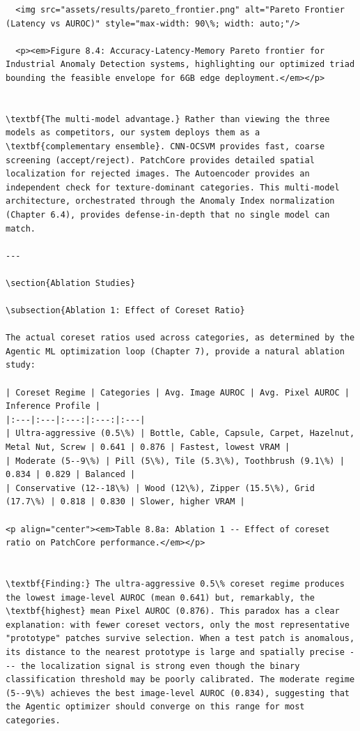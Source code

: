 \documentclass[12pt,a4paper,oneside]{report}
\begin{document}
\begin{verbatim}
  <img src="assets/results/pareto_frontier.png" alt="Pareto Frontier (Latency vs AUROC)" style="max-width: 90\%; width: auto;"/>
  
  <p><em>Figure 8.4: Accuracy-Latency-Memory Pareto frontier for Industrial Anomaly Detection systems, highlighting our optimized triad bounding the feasible envelope for 6GB edge deployment.</em></p>


\textbf{The multi-model advantage.} Rather than viewing the three models as competitors, our system deploys them as a \textbf{complementary ensemble}. CNN-OCSVM provides fast, coarse screening (accept/reject). PatchCore provides detailed spatial localization for rejected images. The Autoencoder provides an independent check for texture-dominant categories. This multi-model architecture, orchestrated through the Anomaly Index normalization (Chapter 6.4), provides defense-in-depth that no single model can match.

---

\section{Ablation Studies}

\subsection{Ablation 1: Effect of Coreset Ratio}

The actual coreset ratios used across categories, as determined by the Agentic ML optimization loop (Chapter 7), provide a natural ablation study:

| Coreset Regime | Categories | Avg. Image AUROC | Avg. Pixel AUROC | Inference Profile |
|:---|:---|:---:|:---:|:---|
| Ultra-aggressive (0.5\%) | Bottle, Cable, Capsule, Carpet, Hazelnut, Metal Nut, Screw | 0.641 | 0.876 | Fastest, lowest VRAM |
| Moderate (5--9\%) | Pill (5\%), Tile (5.3\%), Toothbrush (9.1\%) | 0.834 | 0.829 | Balanced |
| Conservative (12--18\%) | Wood (12\%), Zipper (15.5\%), Grid (17.7\%) | 0.818 | 0.830 | Slower, higher VRAM |

<p align="center"><em>Table 8.8a: Ablation 1 -- Effect of coreset ratio on PatchCore performance.</em></p>


\textbf{Finding:} The ultra-aggressive 0.5\% coreset regime produces the lowest image-level AUROC (mean 0.641) but, remarkably, the \textbf{highest} mean Pixel AUROC (0.876). This paradox has a clear explanation: with fewer coreset vectors, only the most representative "prototype" patches survive selection. When a test patch is anomalous, its distance to the nearest prototype is large and spatially precise --- the localization signal is strong even though the binary classification threshold may be poorly calibrated. The moderate regime (5--9\%) achieves the best image-level AUROC (0.834), suggesting that the Agentic optimizer should converge on this range for most categories.


\end{verbatim}
\end{document}
